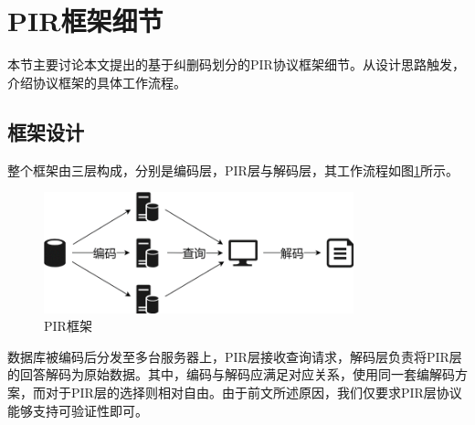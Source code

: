 \section{PIR框架细节}


本节主要讨论本文提出的基于纠删码划分的PIR协议框架细节。从设计思路触发，介绍协议框架的具体工作流程。

\subsection{框架设计}
整个框架由三层构成，分别是编码层，PIR层与解码层，其工作流程如图\ref{fig:pir-framework}所示。

\begin{figure}
    \centering
    \includegraphics[width=0.8\textwidth]{figure/PIR-framework.png}
    \caption{PIR框架}
    \label{fig:pir-framework}
\end{figure}

数据库被编码后分发至多台服务器上，PIR层接收查询请求，解码层负责将PIR层的回答解码为原始数据。其中，编码与解码应满足对应关系，使用同一套编解码方案，而对于PIR层的选择则相对自由。由于前文所述原因，我们仅要求PIR层协议能够支持可验证性即可。

